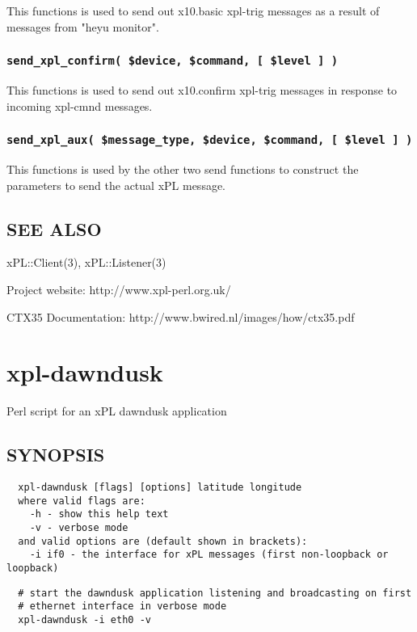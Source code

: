This functions is used to send out x10.basic xpl-trig messages as a
result of messages from "heyu monitor".

\subsubsection*{\texttt{send\_xpl\_confirm( \$device, \$command, [ \$level ] )}\label{xpl-ctx35_send_xpl_confirm_device_command_level_}}


This functions is used to send out x10.confirm xpl-trig messages in
response to incoming xpl-cmnd messages.

\subsubsection*{\texttt{send\_xpl\_aux( \$message\_type, \$device, \$command, [ \$level ] )}\label{xpl-ctx35_send_xpl_aux_message_type_device_command_level_}}


This functions is used by the other two send functions to construct the
parameters to send the actual xPL message.

\subsection*{SEE ALSO\label{xpl-ctx35_SEE_ALSO}}


xPL::Client(3), xPL::Listener(3)



Project website: http://www.xpl-perl.org.uk/



CTX35 Documentation: http://www.bwired.nl/images/how/ctx35.pdf

\section{xpl-dawndusk\label{xpl-dawndusk}}


Perl script for an xPL dawndusk application

\subsection*{SYNOPSIS\label{xpl-dawndusk_SYNOPSIS}}
\begin{verbatim}
  xpl-dawndusk [flags] [options] latitude longitude
  where valid flags are:
    -h - show this help text
    -v - verbose mode
  and valid options are (default shown in brackets):
    -i if0 - the interface for xPL messages (first non-loopback or loopback)
\end{verbatim}
\begin{verbatim}
  # start the dawndusk application listening and broadcasting on first
  # ethernet interface in verbose mode
  xpl-dawndusk -i eth0 -v
\end{verbatim}
